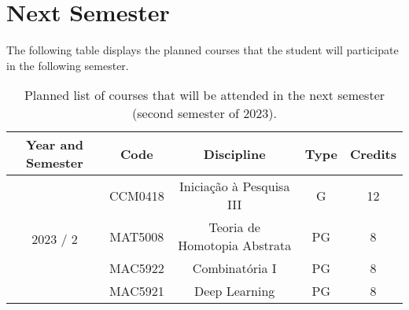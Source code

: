 \documentclass[11pt, reqno]{amsart}
\theoremstyle{definition}
\newtheorem{theorem}{Theorem}[section]
\newtheorem{lemma}[theorem]{Lemma}
\newcommand{\N}{\mathbf{N}}
\begin{document}


\section{Next Semester}

The following table displays the planned courses that the student will
participate in the following semester.

\begin{table}[h!]\label{tab:disc}
    \centering
    \caption{Planned list of courses that will be attended in the next semester (second semester of 2023).}
    \begin{tabular}{ |c|c|c|c|c| }
        \hline
        Year and Semester & Code & Discipline & Type & Credits \\
        \hline
        \multirow{4}{*}{2023 / 2}
              & CCM0418 & Iniciação à Pesquisa III     & G  & 12      \\
              & MAT5008 & Teoria de Homotopia Abstrata & PG & 8 \\
              & MAC5922 & Combinatória I               & PG & 8 \\
              & MAC5921 & Deep Learning                & PG & 8 \\
        \hline
    \end{tabular}
\end{table}
\end{document}
